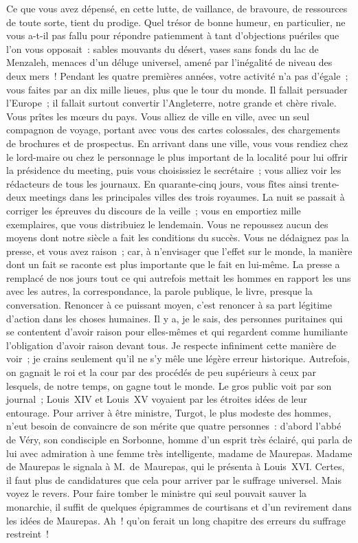 \documentclass[french,twoside]{book} %
\newcommand\orgName[1]{#1}
\newcommand\persName[1]{#1}
\newcommand\placeName[1]{#1}
\begin{document}
Ce que vous avez dépensé, en cette lutte, de vaillance, de bravoure, de ressources de toute sorte, tient du prodige. Quel trésor de bonne humeur, en particulier, ne vous a-t-il pas fallu pour répondre patiemment à tant d’objections puériles que l’on vous opposait : sables mouvants du désert, vases sans fonds du {\placeName lac de Menzaleh}, menaces d’un déluge universel, amené par l’inégalité de niveau des deux mers ! Pendant les quatre premières années, votre activité n’a pas d’égale ; vous faites par an dix mille lieues, plus que le tour du monde. Il fallait persuader l’{\orgName Europe} ; il fallait surtout convertir l’{\orgName Angleterre}, notre grande et chère rivale. Vous prîtes les mœurs du pays. Vous alliez de ville en ville, avec un seul compagnon de voyage, portant avec vous des cartes colossales, des chargements de brochures et de prospectus. En arrivant dans une ville, vous vous rendiez chez le lord-maire ou chez le personnage le plus important de la localité pour lui offrir la présidence du meeting, puis vous choisissiez le secrétaire ; vous alliez voir les rédacteurs de tous les journaux. En quarante-cinq jours, vous fîtes ainsi trente-deux meetings dans les principales villes des trois royaumes. La nuit se passait à corriger les épreuves du discours de la veille ; vous en emportiez mille exemplaires, que vous distribuiez le lendemain. Vous ne repoussez aucun des moyens dont notre siècle a fait les conditions du succès. Vous ne dédaignez pas la presse, et vous avez raison ; car, à n’envisager que l’effet sur le monde, la manière dont un fait se raconte est plus importante que le fait en lui-même. La presse a remplacé de nos jours tout ce qui autrefois mettait les hommes en rapport les uns avec les autres, la correspondance, la parole publique, le livre, presque la conversation. Renoncer à ce puissant moyen, c’est renoncer à sa part légitime d’action dans les choses humaines. Il y a, je le sais, des personnes puritaines qui se contentent d’avoir raison pour elles-mêmes et qui regardent comme humiliante l’obligation d’avoir raison devant tous. Je respecte infiniment cette manière de voir ; je crains seulement qu’il ne s’y mêle une légère erreur historique. Autrefois, on gagnait le roi et la cour par des procédés de peu supérieurs à ceux par lesquels, de notre temps, on gagne tout le monde. Le gros public voit par son journal ; {\persName Louis XIV} et {\persName Louis XV} voyaient par les étroites idées de leur entourage. Pour arriver à être ministre, {\persName Turgot}, le plus modeste des hommes, n’eut besoin de convaincre de son mérite que quatre personnes : d’abord l’{\persName abbé de Véry}, son condisciple en {\orgName Sorbonne}, homme d’un esprit très éclairé, qui parla de lui avec admiration à une femme très intelligente, {\persName madame de Maurepas}. {\persName Madame de Maurepas} le signala à {\persName M. de Maurepas}, qui le présenta à {\persName Louis XVI}. Certes, il faut plus de candidatures que cela pour arriver par le suffrage universel. Mais voyez le revers. Pour faire tomber le ministre qui seul pouvait sauver la monarchie, il suffit de quelques épigrammes de courtisans et d’un revirement dans les idées de {\persName Maurepas}. Ah ! qu’on ferait un long chapitre des erreurs du suffrage restreint !\par
\end{document}
